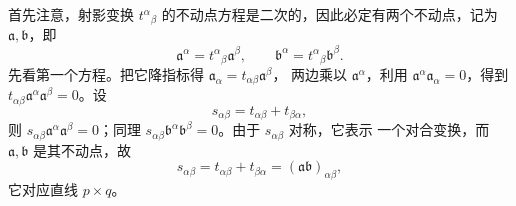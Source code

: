 首先注意，射影变换 $t^\alpha{}_\beta$ 的不动点方程是二次的，因此必定有两个不动点，记为
$\mathfrak a,\mathfrak b$，即
\[
\mathfrak a^\alpha=t^\alpha{}_\beta\mathfrak a^\beta,\qquad
\mathfrak b^\alpha=t^\alpha{}_\beta\mathfrak b^\beta .
\]
先看第一个方程。把它降指标得 $\mathfrak a_\alpha=t_{\alpha\beta}\mathfrak a^\beta$，
两边乘以 $\mathfrak a^\alpha$，利用 $\mathfrak a^\alpha\mathfrak a_\alpha=0$，得到
$t_{\alpha\beta}\mathfrak a^\alpha\mathfrak a^\beta=0$。设
\[
s_{\alpha\beta}=t_{\alpha\beta}+t_{\beta\alpha},
\]
则 $s_{\alpha\beta}\mathfrak a^\alpha\mathfrak a^\beta=0$；同理
$s_{\alpha\beta}\mathfrak b^\alpha\mathfrak b^\beta=0$。由于 $s_{\alpha\beta}$ 对称，它表示
一个对合变换，而 $\mathfrak a,\mathfrak b$ 是其不动点，故
\begin{equation}\label{eq:s}
s_{\alpha\beta}=t_{\alpha\beta}+t_{\beta\alpha}=(\mathfrak a\mathfrak b)_{\alpha\beta},
\end{equation}
它对应直线 $p\times q$。

